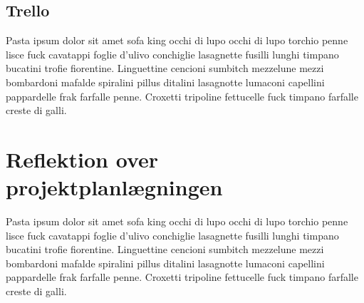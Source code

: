 \subsection{Trello}\label{Trello}
Pasta ipsum dolor sit amet sofa king occhi di lupo occhi di lupo torchio penne lisce fuck cavatappi foglie d'ulivo conchiglie lasagnette fusilli lunghi timpano bucatini trofie fiorentine. Linguettine cencioni sumbitch mezzelune mezzi bombardoni mafalde spiralini pillus ditalini lasagnotte lumaconi capellini pappardelle frak farfalle penne. Croxetti tripoline fettucelle fuck timpano farfalle creste di galli.

\section{Reflektion over projektplanlægningen}\label{Reflektion-over-projektplanlaegningen}
Pasta ipsum dolor sit amet sofa king occhi di lupo occhi di lupo torchio penne lisce fuck cavatappi foglie d'ulivo conchiglie lasagnette fusilli lunghi timpano bucatini trofie fiorentine. Linguettine cencioni sumbitch mezzelune mezzi bombardoni mafalde spiralini pillus ditalini lasagnotte lumaconi capellini pappardelle frak farfalle penne. Croxetti tripoline fettucelle fuck timpano farfalle creste di galli.